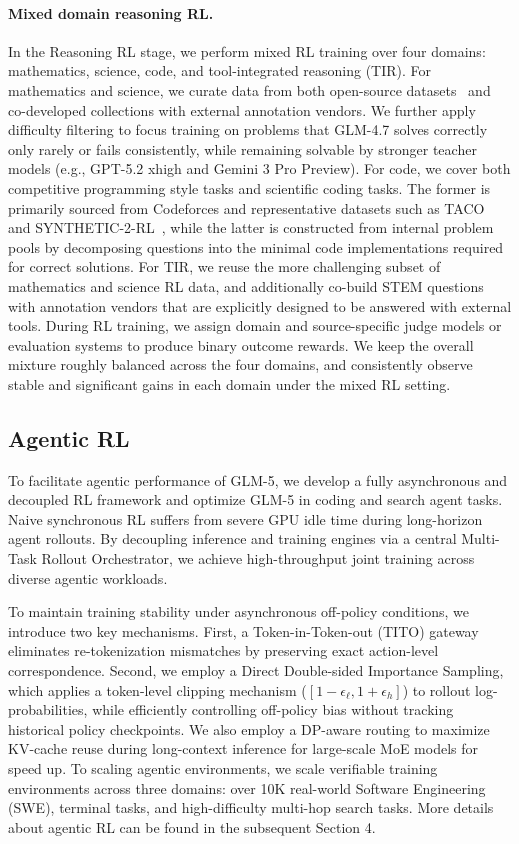 \paragraph{Mixed domain reasoning RL.} In the Reasoning RL stage, we perform mixed RL training over four domains: mathematics, science, code, and tool-integrated reasoning (TIR). For mathematics and science, we curate data from both open-source datasets~\cite{du2025nemotron, moshkov2025aimo} and co-developed collections with external annotation vendors. We further apply difficulty filtering to focus training on problems that GLM-4.7 solves correctly only rarely or fails consistently, while remaining solvable by stronger teacher models (e.g., GPT-5.2 xhigh and Gemini 3 Pro Preview). For code, we cover both competitive programming style tasks and scientific coding tasks. The former is primarily sourced from Codeforces and representative datasets such as TACO~\cite{li2023taco} and SYNTHETIC-2-RL~\cite{synthetic2_blog_2025}, while the latter is constructed from internal problem pools by decomposing questions into the minimal code implementations required for correct solutions. For TIR, we reuse the more challenging subset of mathematics and science RL data, and additionally co-build STEM questions with annotation vendors that are explicitly designed to be answered with external tools. During RL training, we assign domain and source-specific judge models or evaluation systems to produce binary outcome rewards. We keep the overall mixture roughly balanced across the four domains, and consistently observe stable and significant gains in each domain under the mixed RL setting.

\subsection{Agentic RL}
To facilitate agentic performance of GLM-5, we develop a fully asynchronous and decoupled RL framework and optimize GLM-5 in coding and search agent tasks. Naive synchronous RL suffers from severe GPU idle time during long-horizon agent rollouts. By decoupling inference and training engines via a central Multi-Task Rollout Orchestrator, we achieve high-throughput joint training across diverse agentic workloads.

To maintain training stability under asynchronous off-policy conditions, we introduce two key mechanisms. First, a Token-in-Token-out (TITO) gateway eliminates re-tokenization mismatches by preserving exact action-level correspondence. Second, we employ a Direct Double-sided Importance Sampling, which applies a token-level clipping mechanism ($[1-\epsilon_\ell, 1+\epsilon_h]$) to rollout log-probabilities, while efficiently controlling off-policy bias without tracking historical policy checkpoints. We also employ a DP-aware routing to maximize KV-cache reuse during long-context inference for large-scale MoE models for speed up. To scaling agentic environments, we scale verifiable training environments across three domains: over 10K real-world Software Engineering (SWE), terminal tasks, and high-difficulty multi-hop search tasks. More details about agentic RL can be found in the subsequent Section 4.

